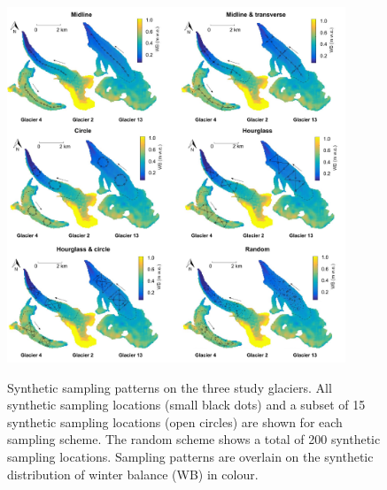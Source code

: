 \documentclass[twocolumn,letterpaper]{igs}
\begin{document}

\begin{figure}
	\centering
	\includegraphics[width =0.9\textwidth]{SamplingDesignAll.pdf}\\
	\caption{Synthetic sampling patterns on the three study glaciers. All synthetic sampling locations (small black dots) and a subset of 15 synthetic sampling locations (open circles) are shown for each sampling scheme. The random scheme shows a total of 200 synthetic sampling locations. Sampling patterns are overlain on the synthetic distribution of winter balance (WB) in colour. } 
       \label{fig:SyntheticSampleDesign}
\end{figure}
\end{document}
